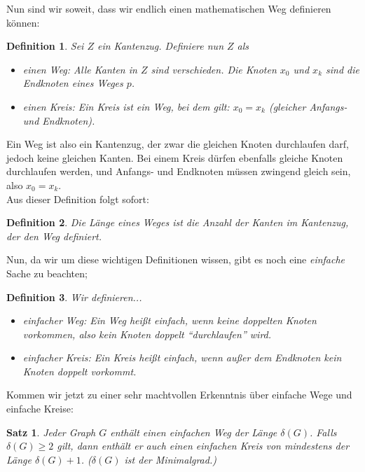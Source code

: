 \documentclass{article}
\newtheorem{theorem}{Satz}
\newtheorem{definition}{Definition}
\begin{document}
\bigskip
Nun sind wir soweit, dass wir endlich einen mathematischen Weg definieren können:\\
\begin{definition}
	Sei $Z$ ein Kantenzug. Definiere nun $Z$ als
	\begin{itemize}
		\item einen \emph{Weg}: Alle Kanten in $Z$ sind verschieden. Die Knoten $x_0$ und $x_k$ sind die \emph{Endknoten} eines Weges $p$.
		\item einen \emph{Kreis}: Ein \emph{Kreis} ist ein Weg, bei dem gilt: $x_0 = x_k$ (gleicher Anfangs- und Endknoten).
	\end{itemize}
\end{definition}
\bigskip
Ein Weg ist also ein Kantenzug, der zwar die gleichen Knoten durchlaufen darf, jedoch keine gleichen Kanten. Bei einem Kreis dürfen ebenfalls gleiche Knoten durchlaufen werden, und Anfangs- und Endknoten müssen zwingend gleich sein, also $x_0 = x_k$.\\
\bigskip
Aus dieser Definition folgt sofort:
\begin{definition}
	Die \emph{Länge} eines Weges ist die Anzahl der Kanten im Kantenzug, der den Weg definiert.
\end{definition}
\bigskip
Nun, da wir um diese wichtigen Definitionen wissen, gibt es noch eine \emph{einfache} Sache zu beachten;\\
\begin{definition}
	Wir definieren...
	\begin{itemize}
		\item \emph{einfacher Weg:} Ein Weg heißt \emph{einfach}, wenn keine doppelten Knoten vorkommen, also kein Knoten doppelt "`durchlaufen"' wird.
		\item \emph{einfacher Kreis:} Ein Kreis heißt \emph{einfach}, wenn außer dem Endknoten kein Knoten doppelt vorkommt.
	\end{itemize}
\end{definition}
Kommen wir jetzt zu einer sehr machtvollen Erkenntnis über einfache Wege und einfache Kreise:\\
\begin{theorem}
	Jeder Graph $G$ enthält einen einfachen Weg der Länge $\delta(G)$. Falls $\delta(G) \geq 2$ gilt, dann enthält er auch einen einfachen Kreis von mindestens der Länge $\delta(G) + 1$. ($\delta(G)$ ist der Minimalgrad.)
\end{theorem}
\end{document}

